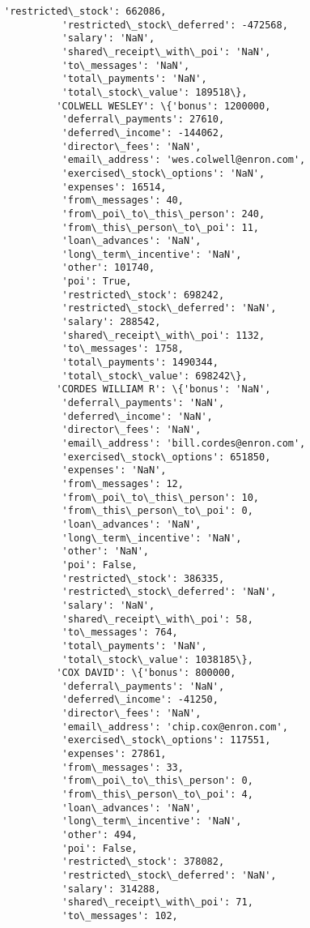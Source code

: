 \documentclass[11pt]{article}
\begin{document}
\begin{Verbatim}[commandchars=\\\{\}]
          'restricted\_stock': 662086,
          'restricted\_stock\_deferred': -472568,
          'salary': 'NaN',
          'shared\_receipt\_with\_poi': 'NaN',
          'to\_messages': 'NaN',
          'total\_payments': 'NaN',
          'total\_stock\_value': 189518\},
         'COLWELL WESLEY': \{'bonus': 1200000,
          'deferral\_payments': 27610,
          'deferred\_income': -144062,
          'director\_fees': 'NaN',
          'email\_address': 'wes.colwell@enron.com',
          'exercised\_stock\_options': 'NaN',
          'expenses': 16514,
          'from\_messages': 40,
          'from\_poi\_to\_this\_person': 240,
          'from\_this\_person\_to\_poi': 11,
          'loan\_advances': 'NaN',
          'long\_term\_incentive': 'NaN',
          'other': 101740,
          'poi': True,
          'restricted\_stock': 698242,
          'restricted\_stock\_deferred': 'NaN',
          'salary': 288542,
          'shared\_receipt\_with\_poi': 1132,
          'to\_messages': 1758,
          'total\_payments': 1490344,
          'total\_stock\_value': 698242\},
         'CORDES WILLIAM R': \{'bonus': 'NaN',
          'deferral\_payments': 'NaN',
          'deferred\_income': 'NaN',
          'director\_fees': 'NaN',
          'email\_address': 'bill.cordes@enron.com',
          'exercised\_stock\_options': 651850,
          'expenses': 'NaN',
          'from\_messages': 12,
          'from\_poi\_to\_this\_person': 10,
          'from\_this\_person\_to\_poi': 0,
          'loan\_advances': 'NaN',
          'long\_term\_incentive': 'NaN',
          'other': 'NaN',
          'poi': False,
          'restricted\_stock': 386335,
          'restricted\_stock\_deferred': 'NaN',
          'salary': 'NaN',
          'shared\_receipt\_with\_poi': 58,
          'to\_messages': 764,
          'total\_payments': 'NaN',
          'total\_stock\_value': 1038185\},
         'COX DAVID': \{'bonus': 800000,
          'deferral\_payments': 'NaN',
          'deferred\_income': -41250,
          'director\_fees': 'NaN',
          'email\_address': 'chip.cox@enron.com',
          'exercised\_stock\_options': 117551,
          'expenses': 27861,
          'from\_messages': 33,
          'from\_poi\_to\_this\_person': 0,
          'from\_this\_person\_to\_poi': 4,
          'loan\_advances': 'NaN',
          'long\_term\_incentive': 'NaN',
          'other': 494,
          'poi': False,
          'restricted\_stock': 378082,
          'restricted\_stock\_deferred': 'NaN',
          'salary': 314288,
          'shared\_receipt\_with\_poi': 71,
          'to\_messages': 102,

\end{Verbatim}
\end{document}
